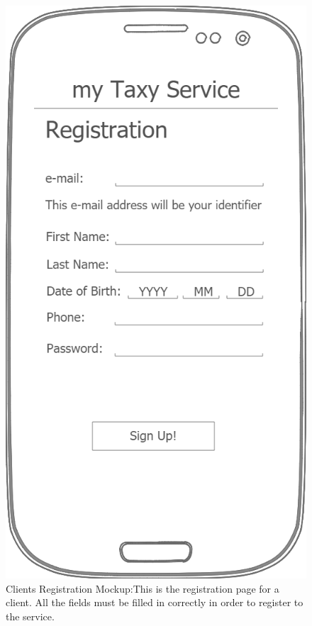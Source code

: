 \documentclass[a4paper]{article}
\begin{document}
\begin{figure}[H]
\includegraphics[width=\mockupWidth]{Mockup-ClientsRegistration}
\centering
\caption[Clients Registration Mockup]{Clients Registration Mockup:\newline This is the registration page for a client. All the fields must be filled in correctly in order to register to the service.}
\label{fig:mockupclientregistration}
\end{figure}
\end{document}

